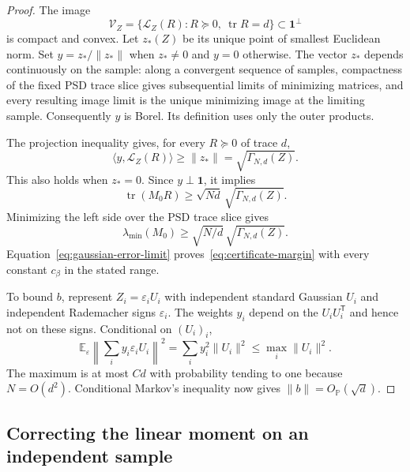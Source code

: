 \documentclass[11pt]{article}
\newcommand{\Pbb}{\mathbb P}
\newcommand{\E}{\mathbb E}
\DeclareMathOperator{\tr}{tr}
\newcommand{\norm}[1]{\lVert#1\rVert}
\newcommand{\OP}{O_{\Pbb}}
\theoremstyle{remark}
\begin{document}
\begin{proof}
The image
\[
 \mathcal V_Z=
 \{\mathcal L_Z(R):R\succeq0,\ \tr R=d\}\subset\mathbf1^\perp
\]
is compact and convex. Let $z_*(Z)$ be its unique point of smallest
Euclidean norm. Set $y=z_*/\norm{z_*}$ when $z_*\ne0$ and $y=0$
otherwise. The vector $z_*$ depends continuously on the sample: along a
convergent sequence of samples, compactness of the fixed PSD trace slice
gives subsequential limits of minimizing matrices, and every resulting
image limit is the unique minimizing image at the limiting sample.
Consequently $y$ is Borel. Its definition uses only the outer products.

The projection inequality gives, for every $R\succeq0$ of trace $d$,
\[
 \langle y,\mathcal L_Z(R)\rangle
 \ge\norm{z_*}=\sqrt{\Gamma_{N,d}(Z)}.
\]
This also holds when $z_*=0$. Since $y\perp\mathbf1$, it implies
\[
 \tr(M_0R)\ge\sqrt{Nd}\,\sqrt{\Gamma_{N,d}(Z)}.
\]
Minimizing the left side over the PSD trace slice gives
\begin{equation}\label{eq:certificate-duality}
 \lambda_{\min}(M_0)
 \ge\sqrt{N/d}\,\sqrt{\Gamma_{N,d}(Z)}.
\end{equation}
Equation~\eqref{eq:gaussian-error-limit} proves~\eqref{eq:certificate-margin}
with every constant $c_\beta$ in the stated range.

To bound $b$, represent $Z_i=\varepsilon_iU_i$ with independent
standard Gaussian $U_i$ and independent Rademacher signs
$\varepsilon_i$. The weights $y_i$ depend on the $U_iU_i^{\mathsf T}$
and hence not on these signs. Conditional on $(U_i)_i$,
\[
 \E_\varepsilon\left\|\sum_i y_i\varepsilon_iU_i\right\|^2
 =\sum_i y_i^2\norm{U_i}^2
 \le\max_i\norm{U_i}^2.
\]
The maximum is at most $Cd$ with probability tending to one because
$N=O(d^2)$. Conditional Markov's inequality now gives
$\norm b=\OP(\sqrt d)$.
\end{proof}

\subsection{Correcting the linear moment on an independent sample}
\end{document}
